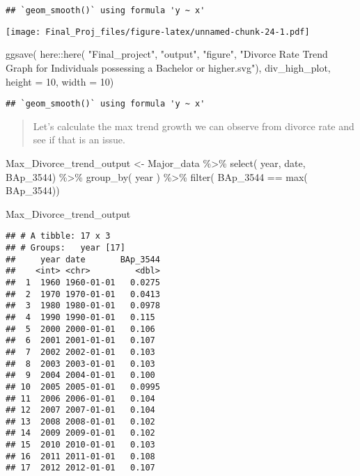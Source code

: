 \documentclass[
]{article}
\newenvironment{Shaded}{\begin{snugshade}}{\end{snugshade}}
\newcommand{\AttributeTok}[1]{\textcolor[rgb]{0.77,0.63,0.00}{#1}}
\newcommand{\DecValTok}[1]{\textcolor[rgb]{0.00,0.00,0.81}{#1}}
\newcommand{\FunctionTok}[1]{\textcolor[rgb]{0.00,0.00,0.00}{#1}}
\newcommand{\NormalTok}[1]{#1}
\newcommand{\OtherTok}[1]{\textcolor[rgb]{0.56,0.35,0.01}{#1}}
\newcommand{\SpecialCharTok}[1]{\textcolor[rgb]{0.00,0.00,0.00}{#1}}
\newcommand{\StringTok}[1]{\textcolor[rgb]{0.31,0.60,0.02}{#1}}
\begin{document}
\begin{verbatim}
## `geom_smooth()` using formula 'y ~ x'
\end{verbatim}

\texttt{[image: Final\_Proj\_files/figure-latex/unnamed-chunk-24-1.pdf]}

\begin{Shaded}
\begin{Highlighting}[]
\FunctionTok{ggsave}\NormalTok{(}
\NormalTok{  here}\SpecialCharTok{::}\FunctionTok{here}\NormalTok{(}
    \StringTok{"Final\_project"}\NormalTok{, }
    \StringTok{"output"}\NormalTok{, }
    \StringTok{"figure"}\NormalTok{,}
    \StringTok{"Divorce Rate Trend Graph for Individuals possessing a Bachelor or higher.svg"}\NormalTok{),}
\NormalTok{       div\_high\_plot,}
       \AttributeTok{height =} \DecValTok{10}\NormalTok{,}
       \AttributeTok{width =} \DecValTok{10}\NormalTok{)}
\end{Highlighting}
\end{Shaded}

\begin{verbatim}
## `geom_smooth()` using formula 'y ~ x'
\end{verbatim}

\begin{quote}
Let's calculate the max trend growth we can observe from divorce rate
and see if that is an issue.
\end{quote}

\begin{Shaded}
\begin{Highlighting}[]
\NormalTok{Max\_Divorce\_trend\_output }\OtherTok{\textless{}{-}}\NormalTok{ Major\_data }\SpecialCharTok{\%\textgreater{}\%}
  \FunctionTok{select}\NormalTok{(}
\NormalTok{    year,}
\NormalTok{    date,}
\NormalTok{    BAp\_3544) }\SpecialCharTok{\%\textgreater{}\%} 
  \FunctionTok{group\_by}\NormalTok{(}
\NormalTok{    year}
\NormalTok{    ) }\SpecialCharTok{\%\textgreater{}\%}
  \FunctionTok{filter}\NormalTok{(}
\NormalTok{    BAp\_3544 }\SpecialCharTok{==} \FunctionTok{max}\NormalTok{(}
\NormalTok{      BAp\_3544))}


\NormalTok{Max\_Divorce\_trend\_output}
\end{Highlighting}
\end{Shaded}

\begin{verbatim}
## # A tibble: 17 x 3
## # Groups:   year [17]
##     year date       BAp_3544
##    <int> <chr>         <dbl>
##  1  1960 1960-01-01   0.0275
##  2  1970 1970-01-01   0.0413
##  3  1980 1980-01-01   0.0978
##  4  1990 1990-01-01   0.115 
##  5  2000 2000-01-01   0.106 
##  6  2001 2001-01-01   0.107 
##  7  2002 2002-01-01   0.103 
##  8  2003 2003-01-01   0.103 
##  9  2004 2004-01-01   0.100 
## 10  2005 2005-01-01   0.0995
## 11  2006 2006-01-01   0.104 
## 12  2007 2007-01-01   0.104 
## 13  2008 2008-01-01   0.102 
## 14  2009 2009-01-01   0.102 
## 15  2010 2010-01-01   0.103 
## 16  2011 2011-01-01   0.108 
## 17  2012 2012-01-01   0.107
\end{verbatim}
\end{document}
